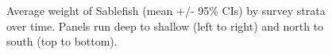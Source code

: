\documentclass[12pt]{article}\usepackage[]{graphicx}\usepackage[]{color}
\begin{document}
\begin{figure}[htb]

{\centering {} 

}

\caption{Average weight of Sablefish (mean +/- 95\% CIs) by survey strata over time. Panels run deep to shallow (left to right) and north to south (top to bottom).}\label{fig:figure9}
\end{figure}
\clearpage
\end{document}
